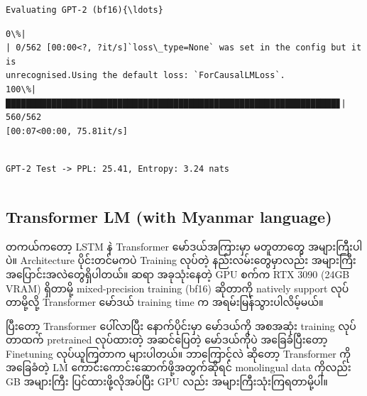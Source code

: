 \documentclass[11pt]{article}
\begin{document}
    \begin{Verbatim}[commandchars=\\\{\}]
Evaluating GPT-2 (bf16){\ldots}
    \end{Verbatim}

    \begin{Verbatim}[commandchars=\\\{\}]
  0\%|
| 0/562 [00:00<?, ?it/s]`loss\_type=None` was set in the config but it is
unrecognised.Using the default loss: `ForCausalLMLoss`.
100\%|█████████████████████████████████████████████████████████████████▊| 560/562
[00:07<00:00, 75.81it/s]
    \end{Verbatim}

    \begin{Verbatim}[commandchars=\\\{\}]

GPT-2 Test -> PPL: 25.41, Entropy: 3.24 nats
    \end{Verbatim}

    \begin{Verbatim}[commandchars=\\\{\}]

    \end{Verbatim}

    \hypertarget{transformer-lm-with-myanmar-language}{%
\subsection{Transformer LM (with Myanmar
language)}\label{transformer-lm-with-myanmar-language}}

{\burmesefont တကယ်ကတော့} LSTM {\burmesefont နဲ} Transformer {\burmesefont မော်ဒယ်အကြားမှာ} {\burmesefont မတူတာတွေ} {\burmesefont အများကြီးပါပဲ။} Architecture
{\burmesefont ပိုင်းတင်မကပဲ} Training {\burmesefont လုပ်တဲ့} {\burmesefont နည်းလမ်းတွေမှာလည်း} {\burmesefont အများကြီး} {\burmesefont အပြောင်းအလဲတွေရှိပါတယ်။} {\burmesefont ဆရာ}
{\burmesefont အခုသုံးနေတဲ့} GPU {\burmesefont စက်က} RTX 3090 (24GB VRAM) {\burmesefont ရှိတာမို့} mixed-precision training
(bf16) {\burmesefont ဆိုတာကို} natively support {\burmesefont လုပ်တာမို့လို့} Transformer {\burmesefont မော်ဒယ်} training time {\burmesefont က}
{\burmesefont အရမ်းမြန်သွားပါလိမ့်မယ်။}

{\burmesefont ပြီးတော့} Transformer {\burmesefont ပေါ်လာပြီး} {\burmesefont နောက်ပိုင်းမှာ} {\burmesefont မော်ဒယ်ကို} {\burmesefont အစအဆုံး} training {\burmesefont လုပ်တာထက်}
pretrained {\burmesefont လုပ်ထားတဲ့} {\burmesefont အဆင်ပြေတဲ့} {\burmesefont မော်ဒယ်ကိုပဲ} {\burmesefont အခြေခံပြီးတော့} Finetuning {\burmesefont လုပ်ယူကြတာက}
{\burmesefont များပါတယ်။} {\burmesefont ဘာကြောင့်လဲ} {\burmesefont ဆိုတော့} Transformer {\burmesefont ကို} {\burmesefont အခြေခံတဲ့} LM {\burmesefont ကောင်းကောင်းဆောက်ဖို့အတွက်ဆိုရင်}
monolingual data {\burmesefont ကိုလည်း} GB {\burmesefont အများကြီး} {\burmesefont ပြင်ထားဖို့လိုအပ်ပြီး} GPU {\burmesefont လည်း}
{\burmesefont အများကြီးသုံးကြရတာမို့ပါ။}
\end{document}
